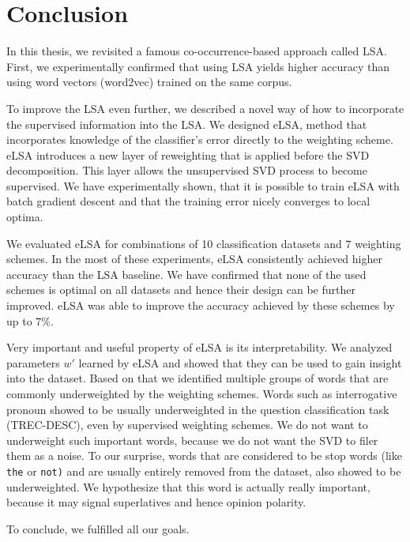 \chapter*{Conclusion}

In this thesis, we revisited a famous co-occurrence-based approach called LSA.
First, we experimentally confirmed that using LSA yields higher accuracy than using
word vectors (word2vec) trained on the same corpus.

To improve the LSA even further, we described a novel way of how to incorporate the supervised information into the LSA.
We designed eLSA, method that incorporates knowledge of the classifier's error directly to the weighting scheme.
eLSA introduces a new layer of reweighting that is applied before the SVD decomposition.
This layer allows the unsupervised SVD process to become supervised.
We have experimentally shown, that it is possible to train eLSA with batch gradient descent and that the training error nicely converges to local optima.

We evaluated eLSA for combinations of 10 classification datasets and $7$ weighting schemes.
In the most of these experiments, eLSA consistently achieved higher accuracy than the LSA baseline.
We have confirmed that none of the used schemes is optimal on all datasets and hence their design can be further improved.
eLSA was able to improve the accuracy achieved by these schemes by up to $7\%$.

Very important and useful property of eLSA is its interpretability.
We analyzed parameters $w'$ learned by eLSA and showed that they can be used to gain insight into the dataset.
Based on that we identified multiple groups of words that are commonly underweighted by the weighting schemes.
Words such as interrogative pronoun showed to be usually underweighted in the question classification task (TREC-DESC), even by supervised weighting schemes. 
We do not want to underweight such important words, because we do not want the SVD to filer them as a noise.
To our surprise, words that are considered to be stop words (like \texttt{the} or \texttt{not)} and are usually entirely removed from the dataset, also showed to be underweighted. 
We hypothesize that this word is actually really important, because it may signal superlatives and hence opinion polarity. 

To conclude, we fulfilled all our goals.
